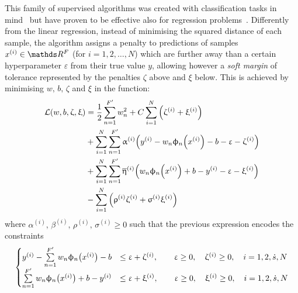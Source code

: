 This family of supervised \ml algorithms was created with classification tasks in mind~\cite{Cortes:1995:SupportvectorNetworks} but have proven to be effective also for regression problems~\cite{Drucker:1997:SupportVectorRegression}.
Differently from the linear regression, instead of minimising the squared distance of each sample, the algorithm assigns a penalty to predictions of samples $x^{(i)} \in \R^F$ (for $i = 1, 2, \dots, N$) which are further away than a certain hyperparameter $\varepsilon$ from their true value $y$, allowing however a \textit{soft margin} of tolerance represented by the penalties $\zeta$ above and $\xi$ below.
This is achieved by minimising $w,\, b,\, \zeta$ and $\xi$ in the function:\footnotemark{}
\begin{equation}
  \begin{split}
    \mathcal{L}\qty(w, b, \upzeta, \upxi)
    & =
    \frac{1}{2} \sum\limits_{n = 1}^{F'} w_n^2
    +
    C \sum\limits_{i = 1}^{N} \qty( \upzeta^{(i)} + \upxi^{(i)} )
    \\
    & +
    \sum\limits_{i = 1}^{N} \sum\limits_{n = 1}^{F'} \upalpha^{(i)}
    \qty( y^{(i)} - w_n \upphi_n\qty(x^{(i)}) - b - \upvarepsilon - \upzeta^{(i)} )
    \\
    & +
    \sum\limits_{i = 1}^{N} \sum\limits_{n = 1}^{F'} \overline{\upeta}^{(i)}
    \qty( w_n \upphi_n\qty(x^{(i)}) + b - y^{(i)} - \upvarepsilon - \upxi^{(i)} )
    \\
    & -
    \sum\limits_{i = 1}^{N} \qty( \uprho^{(i)} \upzeta^{(i)} + \upsigma^{(i)} \upxi^{(i)} )
  \end{split}
  \label{eq:svr:loss}
\end{equation}
where $\alpha^{(i)},\, \beta^{(i)},\, \rho^{(i)},\, \sigma^{(i)} \ge 0$ such that the previous expression encodes the constraints
\begin{equation}
  \begin{cases}
    y^{(i)} - \sum\limits_{n = 1}^{F'} w_n \upphi_n\qty(x^{(i)}) - b & \le \upvarepsilon + \upzeta^{(i)},
    \qquad
    \upvarepsilon \ge 0,
    \quad
    \upzeta^{(i)} \ge 0,
    \quad
    i = 1, 2, \dot{s}, N
    \\
    \sum\limits_{n = 1}^{F'} w_n \upphi_n\qty(x^{(i)}) + b  - y^{(i)} & \le \upvarepsilon + \upxi^{(i)},
    \qquad
    \upvarepsilon \ge 0,
    \quad
    \upxi^{(i)} \ge 0,
    \quad
    i = 1, 2, \dot{s}, N
  \end{cases}
  \label{eq:svr:constraints}
\end{equation}
